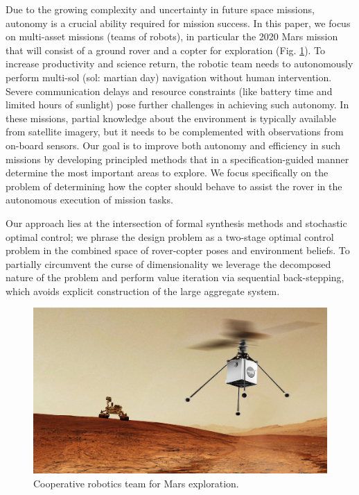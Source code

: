 \documentclass[conference]{IEEEtran}
\begin{document}
Due to the growing complexity and uncertainty in future space missions, autonomy is a crucial ability required for mission success. In this paper, we focus on multi-asset missions (teams of robots), in particular the 2020 Mars mission that will consist of a ground rover and a copter for exploration (Fig. \ref{fig:heli-rover}). To increase productivity and science return, the robotic team needs to autonomously perform multi-sol (sol: martian day) navigation without human intervention. Severe communication delays and resource constraints (like battery time and limited hours of sunlight) pose further challenges in achieving such autonomy. In these missions, partial knowledge about the environment is typically available from satellite imagery, but it needs to be complemented with observations from on-board sensors. Our goal is to improve both autonomy and efficiency in such missions by developing principled methods that in a specification-guided manner determine the most important areas to explore. We focus specifically on the problem of determining how the copter should behave to assist the rover in the autonomous execution of mission tasks.

Our approach lies at the intersection of formal synthesis methods and stochastic optimal control; we phrase the design %
problem as a two-stage optimal control problem in the combined space of rover-copter poses and environment beliefs. To partially circumvent the curse of dimensionality we leverage the decomposed nature of the problem and perform value iteration via sequential back-stepping, which avoids explicit construction of the large aggregate system.
\begin{figure}
  \begin{center}
    \includegraphics[width=0.8\columnwidth]{figs/heli-rover.png}
  \end{center}
  \caption{Cooperative robotics team for Mars exploration.}
  \label{fig:heli-rover}
\end{figure}
\end{document}
